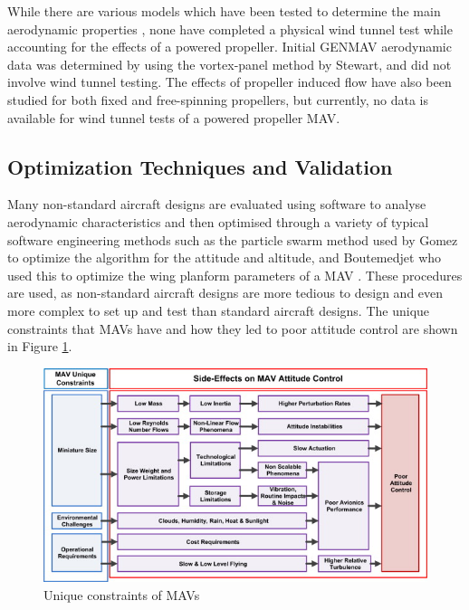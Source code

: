 While there are various models which have been tested to determine the main aerodynamic properties \cite{Stewart2007} \cite{Aboelezz2020}, none have completed a physical wind tunnel test while accounting for the effects of a powered propeller. Initial GENMAV aerodynamic data was determined by using the vortex-panel method by Stewart\cite{Stewart2007}, and did not involve wind tunnel testing. The effects of propeller induced flow have also been studied for both fixed and free-spinning propellers, but currently, no data is available for wind tunnel tests of a powered propeller MAV.

\subsection{Optimization Techniques and Validation}
\label{subsec:Optimization}
Many non-standard aircraft designs are evaluated using software to analyse aerodynamic characteristics and then optimised through a variety of typical software engineering methods such as the particle swarm method used by Gomez to optimize the algorithm for the attitude and altitude, and Boutemedjet who used this to optimize the wing planform parameters of a MAV \cite{Gomez2020, Boutemedjet2019}. These procedures are used, as non-standard aircraft designs are more tedious to design and even more complex to set up and test than standard aircraft designs. The unique constraints that MAVs have and how they led to poor attitude control are shown in Figure \ref{fig:MAVconstrain}.

\begin{figure}[H]
  \centering
   \includegraphics[width=\linewidth]{03_LiteratureReview/Figs/fowchart.jpg}
  \caption{Unique constraints of MAVs \cite{Mohamed2014}}
  \label{fig:MAVconstrain}
\end{figure}

